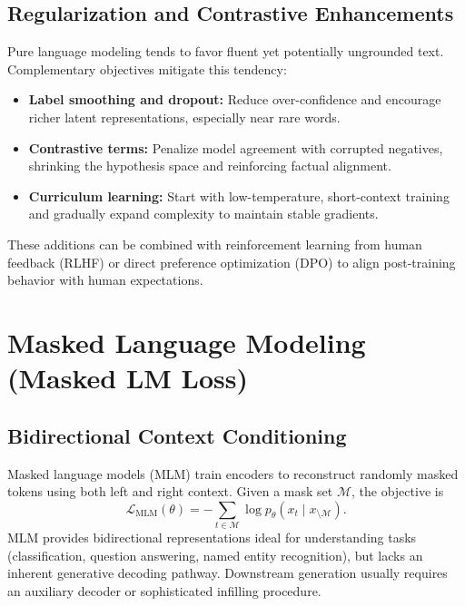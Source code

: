 \documentclass{article}
\begin{document}
\subsection{Regularization and Contrastive Enhancements}
Pure language modeling tends to favor fluent yet potentially ungrounded text. Complementary objectives mitigate this tendency:
\begin{itemize}
  \item \textbf{Label smoothing and dropout:} Reduce over-confidence and encourage richer latent representations, especially near rare words.
  \item \textbf{Contrastive terms:} Penalize model agreement with corrupted negatives, shrinking the hypothesis space and reinforcing factual alignment.
  \item \textbf{Curriculum learning:} Start with low-temperature, short-context training and gradually expand complexity to maintain stable gradients.
\end{itemize}
These additions can be combined with reinforcement learning from human feedback (RLHF) or direct preference optimization (DPO) to align post-training behavior with human expectations.

\section{Masked Language Modeling (Masked LM Loss)}
\subsection{Bidirectional Context Conditioning}
Masked language models (MLM) train encoders to reconstruct randomly masked tokens using both left and right context. Given a mask set $\mathcal{M}$, the objective is
\begin{equation}
  \mathcal{L}_{\text{MLM}}(\theta) = - \sum_{t \in \mathcal{M}} \log p_\theta(x_t \mid x_{\setminus \mathcal{M}}).
\end{equation}
MLM provides bidirectional representations ideal for understanding tasks (classification, question answering, named entity recognition), but lacks an inherent generative decoding pathway. Downstream generation usually requires an auxiliary decoder or sophisticated infilling procedure.
\end{document}
